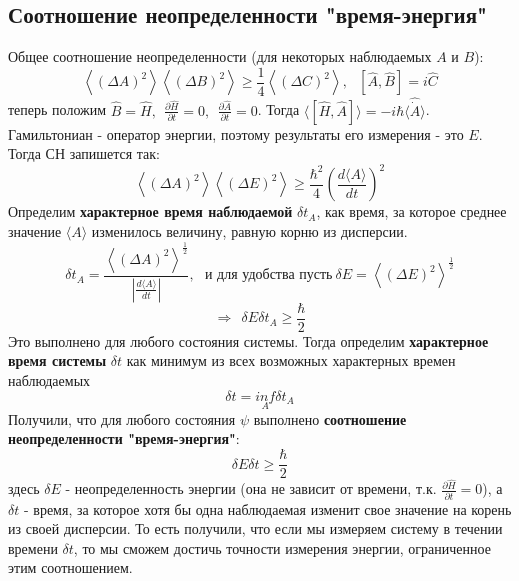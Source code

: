 	\subsection{Соотношение неопределенности "время-энергия"}
		Общее соотношение неопределенности (для некоторых наблюдаемых $A$ и $B$):
		$$
			\left\langle(\Delta A)^2\right\rangle \left\langle(\Delta B)^2\right\rangle \ge \frac{1}{4} \left\langle(\Delta C)^2\right\rangle, \ \ \ \left[\hat{A},\hat{B}\right] = i\hat{C} 
		$$
		теперь положим $\hat{B} = \hat{H}, \ \ \frac{\partial\hat{H}}{\partial t} = 0, \ \ \frac{\partial \hat{A}}{\partial t} = 0$. Тогда $\langle[\hat{H},\hat{A}]\rangle = -i\hbar\langle\hat{\dot{A}}\rangle$. Гамильтониан - оператор энергии, поэтому результаты его измерения - это $E$. Тогда СН запишется так:
		$$
			\left\langle(\Delta A)^2\right\rangle \left\langle(\Delta E)^2\right\rangle \ge \frac{\hbar^2}{4}\left(\frac{d\langle A \rangle}{dt}\right)^2
		$$
		Определим \textbf{характерное время наблюдаемой} $\delta t_A$, как время, за которое среднее значение $\langle A\rangle$ изменилось величину, равную корню из дисперсии.
		$$
			\delta t_A = \frac{\left\langle(\Delta A)^2\right\rangle^{\frac{1}{2}}}{\left|\frac{d\langle A\rangle}{dt}\right|}, \ \ \ \text{и для удобства пусть} \ \delta E = \left\langle(\Delta E)^2\right\rangle^{\frac{1}{2}}
		$$
		$$
			\Rightarrow \ \ \delta E\delta t_A \ge \frac{\hbar}{2}
		$$
		Это выполнено для любого состояния системы. Тогда определим \textbf{характерное время системы} $\delta t$ как минимум из всех возможных характерных времен наблюдаемых
		$$
			\delta t = \underset{A}{inf}\delta t_A
		$$
		Получили, что для любого состояния $\psi$ выполнено \textbf{соотношение неопределенности "время-энергия"}:
		$$
			\delta E \delta t \ge \frac{\hbar}{2}
		$$
		здесь $\delta E$ - неопределенность энергии (она не зависит от времени, т.к. $\frac{\partial \hat{H}}{\partial t} = 0$), а $\delta t$ - время, за которое хотя бы одна наблюдаемая изменит свое значение на корень из своей дисперсии. То есть получили, что если мы измеряем систему в течении времени $\delta t$, то мы сможем достичь точности измерения энергии, ограниченное этим соотношением.
